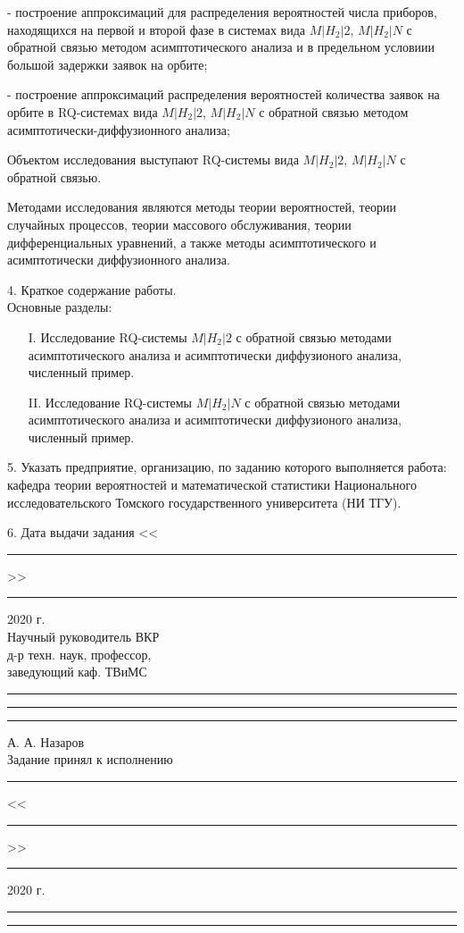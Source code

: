 - построение аппроксимаций для распределения вероятностей числа приборов, находящихся на первой и второй фазе в системах вида $M|H_2|2$, $M|H_2|N$ с обратной связью методом асимптотического анализа и в предельном условиии большой задержки заявок на орбите;

- построение аппроксимаций распределения вероятностей количества заявок на орбите в RQ-системах вида $M|H_2|2$, $M|H_2|N$ с обратной связью методом асимптотически-диффузионного анализа;

Объектом исследования выступают RQ-системы вида $M|H_2|2$, $M|H_2|N$ с обратной связью.

Методами исследования являются методы теории вероятностей, теории случайных процессов, теории массового обслуживания, теории дифференциальных уравнений, а также методы асимптотического и асимптотически диффузионного анализа.

4. Краткое содержание работы.\\
Основные разделы:
\begin{itemize}
	\item[I.] Исследование RQ-системы $M|H_2|2$ с обратной связью методами асимптотического анализа и асимптотически диффузионого анализа, численный пример.
	\item[II.] Исследование RQ-системы $M|H_2|N$ с обратной связью методами асимптотического анализа и асимптотически диффузионого анализа, численный пример.
\end{itemize}

5. Указать предприятие, организацию, по заданию которого выполняется работа:\\
\noindent кафедра теории вероятностей и математической статистики Национального исследовательского Томского государственного университета (НИ ТГУ).

6. Дата выдачи задания <<\rule{10mm}{0.4pt}>>\rule{25mm}{0.4pt} 2020 г.\\[5pt]

\noindent Научный руководитель ВКР\\
\noindent д-р техн. наук, профессор,\\
\noindent заведующий каф. ТВиМС\rule{30mm}{0pt}\rule{30mm}{0.4pt}\rule{30mm}{0pt} А. А. Назаров\\

\noindent Задание принял к исполнению\rule{10mm}{0pt}<<\rule{10mm}{0.4pt}>>\rule{25mm}{0.4pt} 2020 г.\rule{10mm}{0pt}\rule{23mm}{0.4pt}\\

